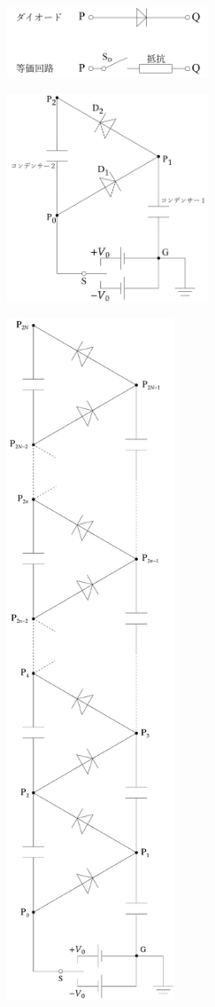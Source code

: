 \begin{minipage}{0.5\linewidth}
  \centering
  \begin{figure}[H]
    \centering
    \includegraphics[width=6cm]{fig/fig_4_19_1.pdf}
    \caption{}
  \end{figure}
  \begin{figure}[H]
    \centering
    \includegraphics[width=6cm]{fig/fig_4_19_2.pdf}
    \caption{}
  \end{figure}
\end{minipage}
\begin{minipage}{0.4\linewidth}
  \centering
  \begin{figure}[H]
    \centering
    \includegraphics[width=5cm]{fig/fig_4_19_3.pdf}
    \caption{}
  \end{figure}
\end{minipage}



